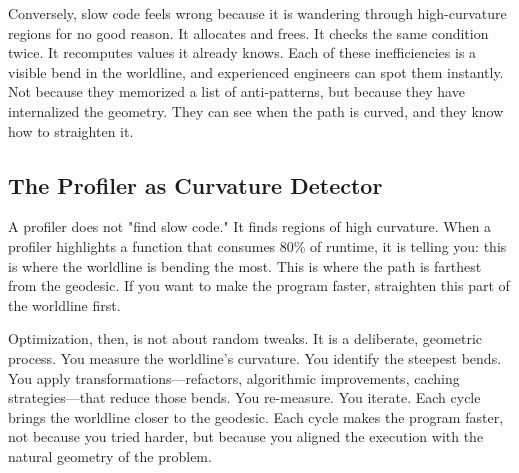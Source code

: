 Conversely, slow code feels wrong because it is wandering through high-curvature regions for no good
reason. It allocates and frees. It checks the same condition twice. It recomputes values it already
knows. Each of these inefficiencies is a visible bend in the worldline, and experienced engineers can
spot them instantly. Not because they memorized a list of anti-patterns, but because they have
internalized the geometry. They can see when the path is curved, and they know how to straighten it.

\subsection{The Profiler as Curvature Detector}

A profiler does not "find slow code." It finds regions of high curvature. When a profiler highlights
a function that consumes 80\% of runtime, it is telling you: this is where the worldline is bending
the most. This is where the path is farthest from the geodesic. If you want to make the program
faster, straighten this part of the worldline first.

Optimization, then, is not about random tweaks. It is a deliberate, geometric process. You measure
the worldline's curvature. You identify the steepest bends. You apply transformations—refactors,
algorithmic improvements, caching strategies—that reduce those bends. You re-measure. You iterate.
Each cycle brings the worldline closer to the geodesic. Each cycle makes the program faster, not
because you tried harder, but because you aligned the execution with the natural geometry of the
problem.

